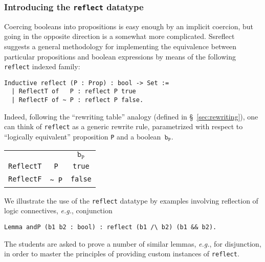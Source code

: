 \documentclass[blockstyle,preprint]{sigplanconf}
\newcommand{\code}[1]{\lstinline{#1}}
\newcommand{\eg}{\emph{e.g.}\xspace}
\begin{document}
\subsubsection{Introducing the \code{reflect} datatype}
\label{sec:reflect}

Coercing booleans into propositions is easy enough by an implicit
coercion, but going in the opposite direction is a somewhat more
complicated. Ssreflect suggests a general methodology for implementing
the equivalence between particular propositions and boolean
expressions by means of the following \code{reflect} indexed family:
%
\begin{lstlisting}
Inductive reflect (P : Prop) : bool -> Set :=
  | ReflectT of   P : reflect P true
  | ReflectF of ~ P : reflect P false.
\end{lstlisting}
%
Indeed, following the ``rewriting table'' analogy (defined in
\S~\ref{sec:rewriting}), one can think of \code{reflect} as a generic
rewrite rule, parametrized with respect to ``logically equivalent''
proposition \code{P} and a boolean~$\mathtt{b_P}$.

\vspace{5pt}

\begin{center}
\hspace{-20pt}
  \begin{tabular}{r|r|c|}
    \cline{3-3}
    \multicolumn{2}{c|}{} & $\mathtt{b_P}$
    \\
    \cline{2-3}
    \multicolumn{1}{r}{\code{ReflectT}} & \multicolumn{1}{|c||}{\code{P}} & \code{true} 
    \\
    \cline{2-3}
\multicolumn{1}{r}{\code{ReflectF}} & \multicolumn{1}{|c||}{{\small\texttt\textasciitilde}~\code{P}}  & \code{false} 
\\\cline{2-3}
  \end{tabular}
\end{center}
%
\vspace{5pt}
%
We illustrate the use of the \code{reflect} datatype by examples
involving reflection of logic connectives, \eg, conjunction
%
\begin{lstlisting}
Lemma andP (b1 b2 : bool) : reflect (b1 /\ b2) (b1 && b2).
\end{lstlisting}
%
The students are asked to prove a number of similar lemmas, \eg, for
disjunction, in order to master the principles of providing custom
instances of \code{reflect}.
\end{document}
